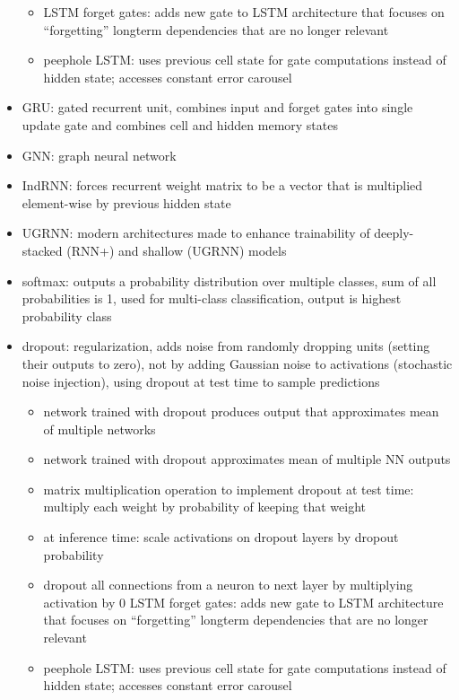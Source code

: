 \documentclass[10pt]{article}
\begin{document}
\begin{itemize}[label=\(\star\), leftmargin=1em, itemsep=-0.3em]
\begin{itemize}[label=\(\star\), leftmargin=1em, itemsep=-0.3em]
              \item LSTM forget gates: adds new gate to LSTM architecture that focuses on “forgetting” longterm dependencies that are no longer relevant
              \item peephole LSTM: uses previous cell state for gate computations instead of hidden state; accesses constant error carousel
          \end{itemize}
    \item GRU: gated recurrent unit, combines input and forget gates into single update gate and combines cell and hidden memory states
    \item GNN: graph neural network
    \item IndRNN: forces recurrent weight matrix to be a vector that is multiplied element-wise by previous hidden state
    \item UGRNN: modern architectures made to enhance trainability of deeply-stacked (RNN+) and shallow (UGRNN) models
    \item softmax: outputs a probability distribution over multiple classes, sum of all probabilities is 1, used for multi-class classification, output is highest probability class
    \item dropout: regularization, adds noise from randomly dropping units (setting their outputs to zero), not by adding Gaussian noise to activations (stochastic noise injection), using dropout at test time to sample predictions
          \begin{itemize}[label=\(\star\), leftmargin=1em, itemsep=-0.3em]
              \item network trained with dropout produces output that approximates mean of multiple networks
              \item network trained with dropout approximates mean of multiple NN outputs
              \item matrix multiplication operation to implement dropout at test time: multiply each weight by probability of keeping that weight
              \item at inference time: scale activations on dropout layers by dropout probability
              \item dropout all connections from a neuron to next layer by multiplying activation by 0
                    LSTM forget gates: adds new gate to LSTM architecture that focuses on “forgetting” longterm dependencies that are no longer relevant
              \item peephole LSTM: uses previous cell state for gate computations instead of hidden state; accesses constant error carousel
          \end{itemize}
\end{itemize}
\end{document}
